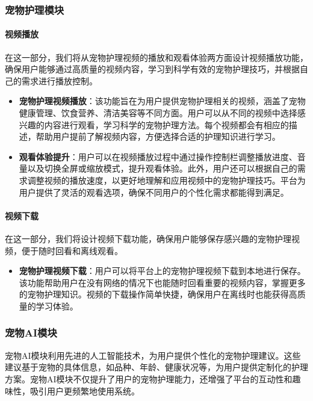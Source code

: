 \subsubsection{宠物护理模块}

\paragraph{视频播放}

在这一部分，我们将从宠物护理视频的播放和观看体验两方面设计视频播放功能，确保用户能够通过高质量的视频内容，学习到科学有效的宠物护理技巧，并根据自己的需求进行播放控制。

\begin{itemize}
	\item \textbf{宠物护理视频播放}：该功能旨在为用户提供宠物护理相关的视频，涵盖了宠物健康管理、饮食营养、清洁美容等不同方面。用户可以从不同的视频中选择感兴趣的内容进行观看，学习科学的宠物护理方法。每个视频都会有相应的描述，帮助用户提前了解视频内容，方便选择合适的护理知识进行学习。
	\item \textbf{观看体验提升}：用户可以在视频播放过程中通过操作控制栏调整播放进度、音量以及切换全屏或缩放模式，提升观看体验。此外，用户还可以根据自己的需求调整视频的播放速度，以更好地理解和应用视频中的宠物护理技巧。平台为用户提供了灵活的观看选项，确保不同用户的个性化需求都能得到满足。
\end{itemize}

\paragraph{视频下载}

在这一部分，我们将设计视频下载功能，确保用户能够保存感兴趣的宠物护理视频，便于随时回看和离线观看。

\begin{itemize}
	\item \textbf{宠物护理视频下载}：用户可以将平台上的宠物护理视频下载到本地进行保存。该功能帮助用户在没有网络的情况下也能随时回看重要的视频内容，掌握更多的宠物护理知识。视频的下载操作简单快捷，确保用户在离线时也能获得高质量的学习体验。
\end{itemize}

\subsubsection{宠物AI模块}

宠物AI模块利用先进的人工智能技术，为用户提供个性化的宠物护理建议。这些建议基于宠物的具体信息，如品种、年龄、健康状况等，为用户提供定制化的护理方案。宠物AI模块不仅提升了用户的宠物护理能力，还增强了平台的互动性和趣味性，吸引用户更频繁地使用系统。


